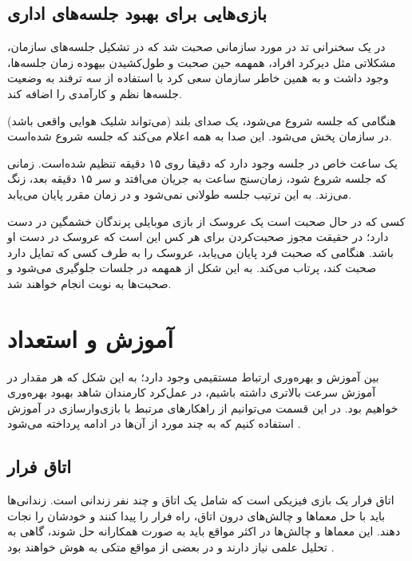 \subsection{بازی‌هایی برای بهبود جلسه‌های اداری}
در یک سخنرانی تد \cite{tedx} در مورد سازمانی صحبت شد که در تشکیل جلسه‌های سازمان، مشکلاتی مثل دیرکرد افراد، همهمه حین صحبت و طول‌کشیدن بیهوده زمان جلسه‌ها، وجود داشت و به همین خاطر سازمان سعی کرد با استفاده از سه ترفند به وضعیت جلسه‌ها نظم و کارآمدی را اضافه کند.
\begin{trick}
هنگامی که جلسه شروع می‌شود، یک صدای بلند (می‌تواند شلیک هوایی واقعی باشد) در سازمان پخش می‌شود. این صدا به همه اعلام می‌کند که جلسه شروع شده‌است.
\end{trick}
\begin{trick}
یک ساعت خاص در جلسه وجود دارد که دقیقا روی ۱۵ دقیقه تنظیم شده‌است. زمانی که جلسه شروع شود، زمان‌سنج ساعت به جریان می‌افتد و سر ۱۵ دقیقه بعد، زنگ می‌زند. به این ترتیب جلسه طولانی نمی‌شود و در زمان مقرر پایان می‌یابد.
\end{trick}
\begin{trick}
کسی که در حال صحبت است یک عروسک از بازی موبایلی پرندگان خشمگین در دست دارد؛ در حقیقت مجوز صحبت‌کردن برای هر کس این است که عروسک در دست او باشد. هنگامی که صحبت فرد پایان می‌یابد، عروسک را به طرف کسی که تمایل دارد صحبت کند، پرتاب می‌کند. به این شکل از همهمه در جلسات جلوگیری می‌شود و صحبت‌ها به نوبت انجام خواهند شد.
\end{trick}
\section{آموزش و استعداد}
بین آموزش و بهره‌وری ارتباط مستقیمی وجود دارد؛ به این شکل که هر مقدار در آموزش سرعت بالاتری داشته باشیم، در عمل‌کرد کارمندان شاهد بهبود بهره‌وری خواهیم بود. در این قسمت می‌توانیم از راهکارهای مرتبط با بازی‌وارسازی در آموزش استفاده کنیم که به چند مورد از آن‌ها در ادامه پرداخته می‌شود \cite{amiriamin}.
\subsection[اتاق فرار]{اتاق فرار\protect{}}
اتاق فرار یک بازی فیزیکی است که شامل یک اتاق و چند نفر زندانی است. زندانی‌ها باید با حل معماها و چالش‌های درون اتاق، راه فرار را پیدا کنند و خودشان را نجات دهند. این معماها و چالش‌ها در اکثر مواقع باید به صورت همکارانه حل شوند، گاهی به تحلیل علمی نیاز دارند و در بعضی از مواقع متکی به هوش خواهند بود \cite{atoz}.


